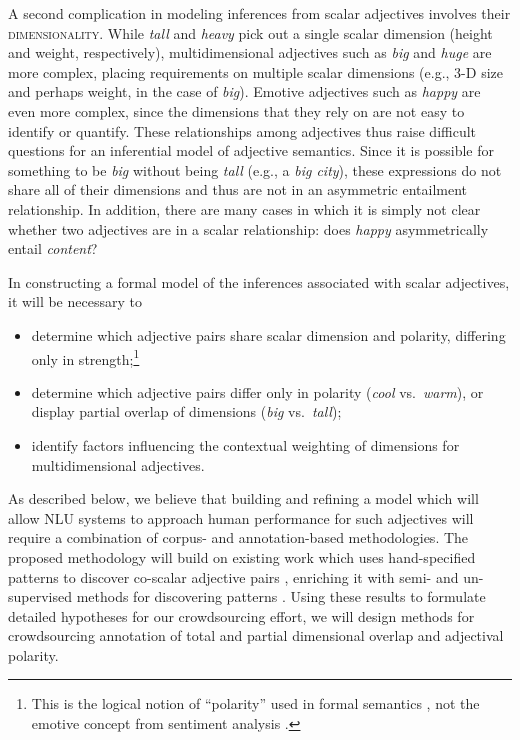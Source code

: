 \documentclass[10pt]{article}
\begin{document}
A second complication in modeling inferences from scalar adjectives involves their \textsc{dimensionality}. While \emph{tall} and \emph{heavy} pick out a single scalar dimension (height and weight, respectively), multidimensional adjectives such as \emph{big} and \emph{huge} are more complex, placing requirements on multiple scalar dimensions (e.g., 3-D size and perhaps weight, in the case of \emph{big}). Emotive adjectives such as \emph{happy} are even more complex, since the dimensions that they rely on are not easy to identify or quantify. These relationships among adjectives thus raise difficult questions for an inferential model of adjective semantics. Since it is possible for something to be \emph{big} without being \emph{tall} (e.g., a \emph{big city}), these expressions do not share all of their dimensions and thus are not in an asymmetric entailment relationship. In addition, there are many cases in which it is simply not clear whether two adjectives are in a scalar relationship: does \emph{happy} asymmetrically entail \emph{content}? 

In constructing a formal model of the inferences associated with scalar adjectives, it will be necessary to 
 \vspace{-.25in}
\begin{itemize}
\item [1.] determine which adjective pairs share scalar dimension and polarity, differing only in strength;\footnote{\label{polarity}This is the logical notion of ``polarity'' used in formal semantics \cite{kennedy2001polar}, not the emotive concept from sentiment analysis \cite{wilson2009recognizing,williams2009predicting}.}
\item [2.] determine which adjective pairs differ only in polarity (\emph{cool} vs.\ \emph{warm}), or display partial overlap of dimensions (\emph{big} vs.\ \emph{tall});
\item [3.] identify factors influencing the contextual weighting of dimensions for multidimensional adjectives.\end{itemize}
 \vspace{-.05in}

As described below, we believe that building and refining a model which will allow NLU systems to approach human performance for such adjectives will require a combination of corpus- and annotation-based methodologies. The proposed methodology will build on existing work which uses hand-specified patterns to discover co-scalar adjective pairs \cite{sheinman2009adjscales,sheinmanetal2013}, enriching it with semi- and un-supervised methods for discovering patterns \cite{snow04,davidov2008unsupervised,turney2008uniform}. Using these results to formulate detailed hypotheses for our crowdsourcing effort, we will design methods for crowdsourcing annotation of total and partial dimensional overlap and adjectival polarity. 
\end{document}
